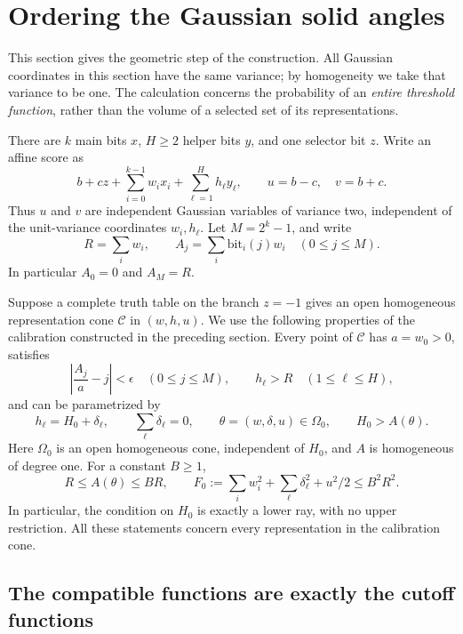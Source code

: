 \section{Ordering the Gaussian solid angles}
\label{vol:section}

This section gives the geometric step of the construction. All Gaussian
coordinates in this section have the same variance; by homogeneity we take
that variance to be one. The calculation concerns the probability of an
\emph{entire threshold function}, rather than the volume of a selected set of
its representations.

There are $k$ main bits $x$, $H\ge2$ helper bits $y$, and one selector bit $z$.
Write an affine score as
\[
 b+c z+\sum_{i=0}^{k-1}w_i x_i+\sum_{\ell=1}^H h_\ell y_\ell,
 \qquad u=b-c,\quad v=b+c.
\]
Thus $u$ and $v$ are independent Gaussian variables of variance two,
independent of the unit-variance coordinates $w_i,h_\ell$.
Let $M=2^k-1$, and write
\[
 R=\sum_iw_i,\qquad A_j=\sum_i\mathrm{bit}_i(j)w_i\quad(0\le j\le M).
\]
In particular $A_0=0$ and $A_M=R$.

Suppose a complete truth table on the branch $z=-1$ gives an open homogeneous
representation cone $\mathcal C$ in $(w,h,u)$. We use the following properties
of the calibration constructed in the preceding section. Every point of
$\mathcal C$ has $a=w_0>0$, satisfies
\begin{equation}\label{vol:binary}
 \left|\frac{A_j}{a}-j\right|<\epsilon\quad(0\le j\le M),
 \qquad h_\ell>R\quad(1\le\ell\le H),
\end{equation}
and can be parametrized by
\[
 h_\ell=H_0+\delta_\ell,\qquad \sum_\ell\delta_\ell=0,
 \qquad \theta=(w,\delta,u)\in\Omega_0,
 \qquad H_0>A(\theta).
\]
Here $\Omega_0$ is an open homogeneous cone, independent of $H_0$, and
$A$ is homogeneous of degree one. For a constant $B\ge1$,
\begin{equation}\label{vol:scaffold-bounds}
 R\le A(\theta)\le BR,\qquad
 F_0:=\sum_iw_i^2+\sum_\ell\delta_\ell^2+u^2/2\le B^2R^2.
\end{equation}
In particular, the condition on $H_0$ is exactly a lower ray, with no upper
restriction. All these statements concern every representation in the
calibration cone.

\subsection{The compatible functions are exactly the cutoff functions}

